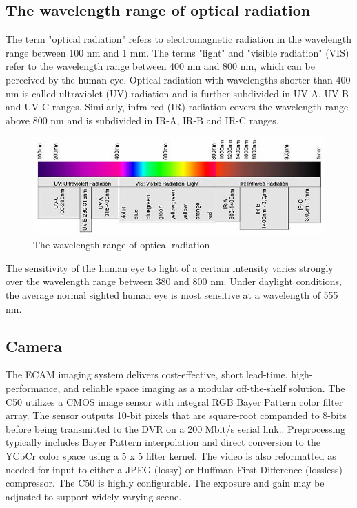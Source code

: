 \subsection{The wavelength range of optical radiation}

The term "optical radiation" refers to electromagnetic radiation in the wavelength range between 100 nm and 1 mm. The terms "light" and "visible radiation" (VIS) refer to the wavelength range between 400 nm and 800 nm, which can be perceived by the human eye. Optical radiation with wavelengths shorter than 400 nm is called ultraviolet (UV) radiation and is further subdivided in UV-A, UV-B and UV-C ranges. Similarly, infra-red (IR) radiation covers the wavelength range above 800 nm and is subdivided in IR-A, IR-B and IR-C ranges.

\begin{figure}[htb]
\centering
\includegraphics[scale=1]{figures/camera/bh8.jpg}
\caption{The wavelength range of optical radiation}
\end{figure}

The sensitivity of the human eye to light of a certain intensity varies strongly over the wavelength range between 380 and 800 nm. Under daylight conditions, the average normal sighted human eye is most sensitive at a wavelength of 555 nm.

\subsection{Camera}

The ECAM imaging system delivers cost-effective, short lead-time, high-performance, and reliable space imaging as a modular off-the-shelf solution. The C50 utilizes a CMOS image sensor with integral RGB Bayer Pattern color filter array. The sensor outputs 10-bit pixels that are square-root companded to 8-bits before being transmitted to the DVR on a 200 Mbit/s serial link.. Preprocessing typically includes Bayer Pattern interpolation and direct conversion to the YCbCr color space using a 5 x 5 filter kernel. The video is also reformatted as needed for input to either a JPEG (lossy) or Huffman First Difference (lossless) compressor. The C50 is highly configurable. The exposure and gain may be adjusted to support widely varying scene.


